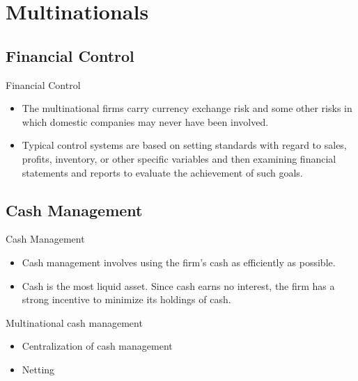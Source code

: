 \documentclass[international_finance_p2.tex]{subfiles}
\begin{document}
\section{Multinationals}

\subsection{Financial Control}
\begin{frame}{Financial Control}
\begin{itemize}[<+->]
\item
The multinational firms carry currency exchange risk and some other risks in which domestic companies may never have been involved.
\item
Typical control systems are based on setting standards with regard to sales, profits, inventory, or other specific variables and then examining financial statements and reports to evaluate the achievement of such goals.
\end{itemize}
\end{frame}

\subsection{Cash Management}
\begin{frame}{Cash Management}
\begin{itemize}[<+->]
\item
Cash management involves using the firm’s cash as efficiently as possible. 
\item
Cash is the most liquid asset. 
Since cash earns no interest, the firm has a strong incentive to minimize its holdings of cash.
\end{itemize}
\end{frame}
\begin{frame}{Multinational cash management}
\begin{itemize}[<+->]
\item
Centralization of cash management
\item
Netting
\end{itemize}
\end{frame}
\end{document}
